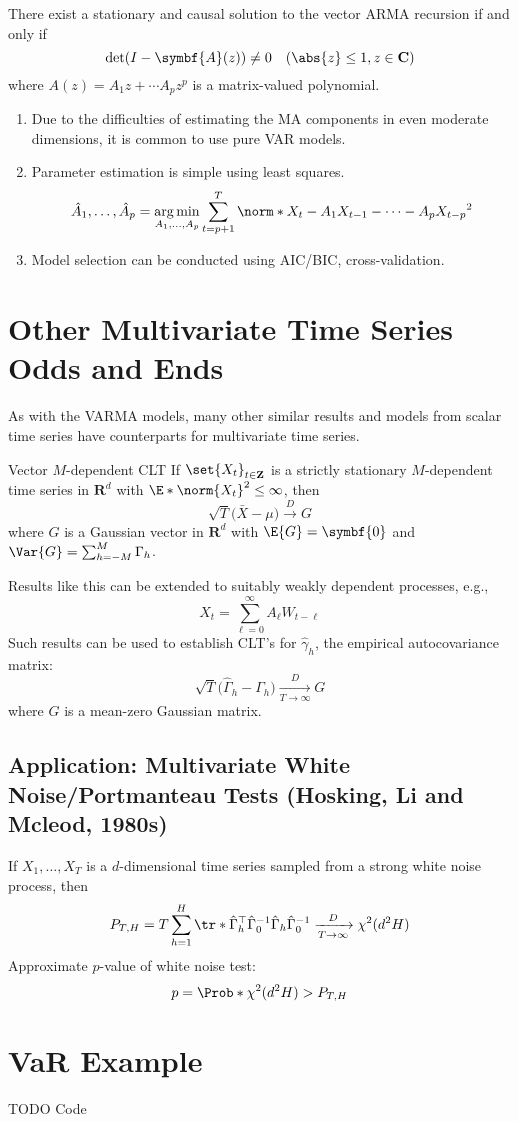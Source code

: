 \begin{Theorem}{}{}
    There exist a stationary and causal solution to the vector ARMA recursion if and only if
    \[ \det(I-\symbf{A}(z))\ne 0\quad(\abs{z}\le 1,z\in\mathbf{C}) \]
    where $ A(z)=A_1 z+\cdots A_p z^p $ is a matrix-valued polynomial.
\end{Theorem}
\begin{Remark}{}{}
    \begin{enumerate}[(1)]
        \item Due to the difficulties of estimating the MA components in even moderate dimensions,
              it is common to use pure VAR models.
        \item Parameter estimation is simple using least squares.
              \[ \hat{A}_1,\ldots,\hat{A}_p=\argmin_{A_1,\ldots,A_p}\sum_{t=p+1}^{T}\norm*{X_t-A_1 X_{t-1}-\cdots -A_p X_{t-p}}^2  \]
        \item Model selection can be conducted using AIC/BIC, cross-validation.
    \end{enumerate}
\end{Remark}
\section{Other Multivariate Time Series Odds and Ends}
As with the VARMA models, many other similar results and models
from scalar time series have counterparts for multivariate time series.
\begin{Theorem}{Vector $ M $-dependent CLT}{}
    If $ \set{X_t}_{t\in\mathbf{Z}} $ is a strictly stationary $ M $-dependent
    time series in $ \mathbf{R}^d $ with $ \E*{\norm{X_t}^2}\le \infty $, then
    \[ \sqrt{T}\bigl(\bar{X}-\mu\bigr)\xrightarrow{D}G \]
    where $ G $ is a Gaussian vector in $ \mathbf{R}^d $
    with $ \E{G}=\symbf{0} $ and $ \Var{G}=\sum_{h=-M}^{M} \Gamma_h $.
\end{Theorem}
Results like this can be extended to suitably weakly dependent processes, e.g.,
\[ X_t=\sum_{\ell=0}^{\infty} A_\ell W_{t-\ell} \]
Such results can be used to establish CLT's for $ \hat{\gamma}_h $,
the empirical autocovariance matrix:
\[ \sqrt{T}\bigl(\hat{\Gamma}_h-\Gamma_h\bigr)\xrightarrow[T\to\infty]{D}G \]
where $ G $ is a mean-zero Gaussian matrix.
\subsection*{Application: Multivariate White Noise/Portmanteau Tests (Hosking, Li and Mcleod, 1980s)}
If $ X_1,\ldots,X_T $ is a $ d $-dimensional time series sampled from a strong white noise process, then
\[ P_{T,H}=T \sum_{h=1}^{H} \tr*{\hat{\Gamma}_h^\top \hat{\Gamma}_0^{-1}\hat{\Gamma}_h\hat{\Gamma}_0^{-1}}
    \xrightarrow[T\to\infty]{D}\chi^2(d^2 H) \]
Approximate $ p $-value of white noise test:
\[ p=\Prob*{\chi^2(d^2 H)>P_{T,H}} \]
\section{VaR Example}
TODO Code
